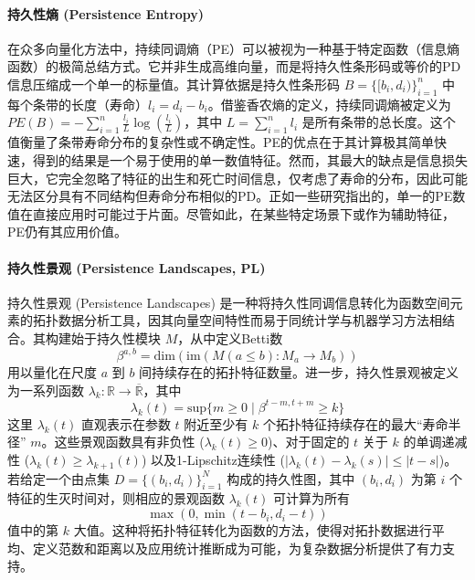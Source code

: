 \paragraph{持久性熵 (Persistence Entropy)}
\label{sec:feat_pe}
在众多向量化方法中，持续同调熵（PE）\cite{atienza2020stability}可以被视为一种基于特定函数（信息熵函数）的极简总结方式。它并非生成高维向量，而是将持久性条形码或等价的PD信息压缩成一个单一的标量值。其计算依据是持久性条形码 $B = \{[b_i, d_i)\}_{i=1}^n$ 中每个条带的长度（寿命）$l_i = d_i - b_i$。借鉴香农熵的定义，持续同调熵被定义为 $PE(B) = -\sum_{i=1}^{n} \frac{l_i}{L} \log(\frac{l_i}{L})$，其中 $L = \sum_{i=1}^{n} l_i$ 是所有条带的总长度。这个值衡量了条带寿命分布的复杂性或不确定性。PE的优点在于其计算极其简单快速，得到的结果是一个易于使用的单一数值特征。然而，其最大的缺点是信息损失巨大，它完全忽略了特征的出生和死亡时间信息，仅考虑了寿命的分布，因此可能无法区分具有不同结构但寿命分布相似的PD。正如一些研究指出的，单一的PE数值在直接应用时可能过于片面。尽管如此，在某些特定场景下或作为辅助特征，PE仍有其应用价值。

\paragraph{持久性景观 (Persistence Landscapes, PL)}
\label{sec:feat_pl}
持久性景观 (Persistence Landscapes) \cite{1} 是一种将持久性同调信息转化为函数空间元素的拓扑数据分析工具，因其向量空间特性而易于同统计学与机器学习方法相结合。其构建始于持久性模块 $M$，从中定义Betti数
\begin{equation}
    \label{eq:betti_number} %
    \beta^{a,b} = \text{dim}(\text{im}(M(a \le b): M_a \rightarrow M_b))
\end{equation}
用以量化在尺度 $a$ 到 $b$ 间持续存在的拓扑特征数量。进一步，持久性景观被定义为一系列函数 $\lambda_k: \mathbb{R} \rightarrow \overline{\mathbb{R}}$，其中
\begin{equation}
    \label{eq:lambda_k_definition}
    \lambda_k(t) = \text{sup}\{m \ge 0 \mid \beta^{t-m,t+m} \ge k\}
\end{equation}
这里 $\lambda_k(t)$ 直观表示在参数 $t$ 附近至少有 $k$ 个拓扑特征持续存在的最大“寿命半径” $m$。这些景观函数具有非负性 ($\lambda_k(t) \ge 0$)、对于固定的 $t$ 关于 $k$ 的单调递减性 ($\lambda_k(t) \ge \lambda_{k+1}(t)$) 以及1-Lipschitz连续性 ($|\lambda_k(t) - \lambda_k(s)| \le |t-s|$)。若给定一个由点集 $D = \{(b_i, d_i)\}_{i=1}^N$ 构成的持久性图，其中 $(b_i,d_i)$ 为第 $i$ 个特征的生灭时间对，则相应的景观函数 $\lambda_k(t)$ 可计算为所有
\begin{equation}
    \label{eq:lambda_k_from_diagram_core}
    \max(0, \min(t-b_i, d_i-t))
\end{equation}
值中的第 $k$ 大值。这种将拓扑特征转化为函数的方法，使得对拓扑数据进行平均、定义范数和距离以及应用统计推断成为可能，为复杂数据分析提供了有力支持。



